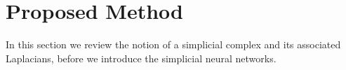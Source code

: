\section{Proposed Method}

In this section we review the notion of a simplicial complex and its associated Laplacians, before we introduce the simplicial neural networks. 




